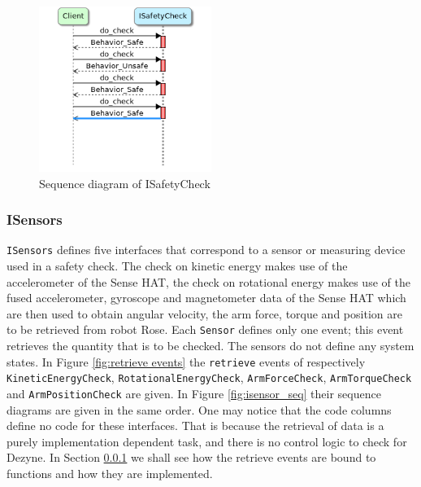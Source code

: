 \documentclass[12pt]{scrreprt}
\begin{document}
\begin{figure}[H]
    \centering
    \includegraphics[width=0.5\textwidth]{Figures/results/modelling_figures/ISafetyCheck/ISafetyCheck_seq.png}
    \caption{Sequence diagram of ISafetyCheck}
    \label{fig:Sequence diagram of ISafetyCheck.}
\end{figure}

\subsubsection{ISensors}
\texttt{ISensors} defines five interfaces that correspond to a sensor or measuring device used in a safety check. The check on kinetic energy makes use of the accelerometer of the Sense HAT, the check on rotational energy makes use of the fused accelerometer, gyroscope and magnetometer data of the Sense HAT which are then used to obtain angular velocity, the arm force, torque and position are to be retrieved from robot Rose. Each \texttt{Sensor} defines only one event; this event retrieves the quantity that is to be checked. The sensors do not define any system states. In Figure \ref{fig:retrieve events} the \texttt{retrieve} events of respectively \texttt{KineticEnergyCheck}, \texttt{RotationalEnergyCheck}, \texttt{ArmForceCheck}, \texttt{ArmTorqueCheck} and \texttt{ArmPositionCheck} are given. In Figure \ref{fig:isensor_seq} their sequence diagrams are given in the same order. One may notice that the code columns define no code for these interfaces. That is because the retrieval of data is a purely implementation dependent task, and there is no control logic to check for Dezyne. In Section \ref{} we shall see how the retrieve events are bound to functions and how they are implemented.
\end{document}
